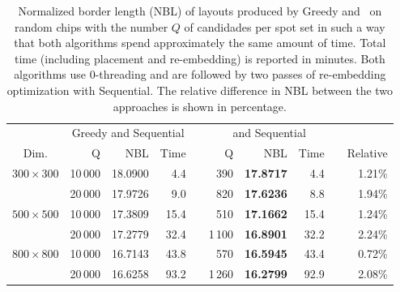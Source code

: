 \begin{table}[p!]\centering
\caption{\label{tab:greedycomp_bl}
  Normalized border length (NBL) of layouts produced by Greedy and \Greedyplus\
  on random chips with the number $Q$ of candidades per spot set in such a way
  that both algorithms spend approximately the same amount of time. Total time
  (including placement and re-embedding) is reported in minutes. Both algorithms
  use $0$-threading and are followed by two passes of re-embedding optimization
  with Sequential. The relative difference in NBL between the two approaches is
  shown in percentage.}
\footnotesize{
\begin{tabular}{crrrlrrrlr}
\vspace{1pt}
                & \multicolumn{3}{c}{Greedy and Sequential} & & \multicolumn{3}{c}{\Greedyplus\ and Sequential} \\ \cline{2-4} \cline{6-8}
\vspace{1pt}
Dim.            & Q       & NBL     & Time     & & Q      & NBL           & Time     & & Relative\\
\hline
$300\times 300$ & 10\,000 & 18.0900 &  4.4 & &    390 & {\bf 17.8717} &  4.4 & & 1.21\% \\
                & 20\,000 & 17.9726 &  9.0 & &    820 & {\bf 17.6236} &  8.8 & & 1.94\% \\
\hline
$500\times 500$ & 10\,000 & 17.3809 & 15.4 & &    510 & {\bf 17.1662} & 15.4 & & 1.24\% \\
                & 20\,000 & 17.2779 & 32.4 & & 1\,100 & {\bf 16.8901} & 32.2 & & 2.24\% \\
\hline
$800\times 800$ & 10\,000 & 16.7143 & 43.8 & &    570 & {\bf 16.5945} & 43.4 & & 0.72\% \\
                & 20\,000 & 16.6258 & 93.2 & & 1\,260 & {\bf 16.2799} & 92.9 & & 2.08\% \\
\hline
\end{tabular}}
\end{table}

